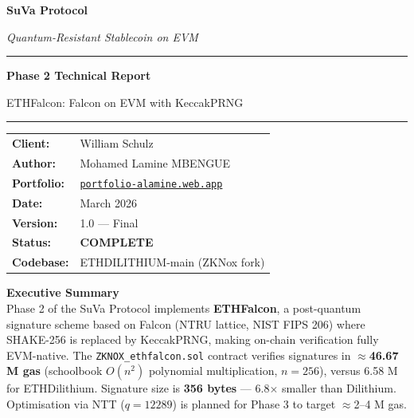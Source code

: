 \documentclass[11pt,a4paper]{article}
\begin{document}

\begin{titlepage}
\centering
\vspace*{2cm}
{\Huge\bfseries\textcolor{suva-blue}{SuVa Protocol}\par}
\vspace{0.5cm}
{\Large\textit{Quantum-Resistant Stablecoin on EVM}\par}
\vspace{1.5cm}
\rule{\linewidth}{0.5pt}
\vspace{0.5cm}
{\LARGE\bfseries Phase 2 Technical Report\par}
\vspace{0.3cm}
{\large ETHFalcon: Falcon on EVM with KeccakPRNG\par}
\vspace{0.5cm}
\rule{\linewidth}{0.5pt}
\vspace{2cm}

\begin{tabular}{ll}
\textbf{Client:}    & William Schulz \\[4pt]
\textbf{Author:}    & Mohamed Lamine MBENGUE \\[4pt]
\textbf{Portfolio:} & \href{https://portfolio-alamine.web.app}{\texttt{portfolio-alamine.web.app}} \\[4pt]
\textbf{Date:}      & March 2026 \\[4pt]
\textbf{Version:}   & 1.0 --- Final \\[4pt]
\textbf{Status:}    & \textcolor{pass-green}{\textbf{COMPLETE}} \\[4pt]
\textbf{Codebase:}  & ETHDILITHIUM-main (ZKNox fork) \\
\end{tabular}

\vfill
\begin{tcolorbox}[enhanced,colback=suva-blue!8,colframe=suva-blue,arc=4mm]
\textbf{Executive Summary} \\[4pt]
Phase 2 of the SuVa Protocol implements \textbf{ETHFalcon}, a post-quantum
signature scheme based on Falcon (NTRU lattice, NIST FIPS 206) where SHAKE-256
is replaced by KeccakPRNG, making on-chain verification fully EVM-native.
The \texttt{ZKNOX\_ethfalcon.sol} contract verifies signatures in
\textbf{$\approx$46.67 M gas} (schoolbook $O(n^2)$ polynomial multiplication,
$n=256$), versus 6.58 M for ETHDilithium. Signature size is
\textbf{356 bytes} --- 6.8$\times$ smaller than Dilithium.
Optimisation via NTT ($q=12289$) is planned for Phase 3 to target
$\approx$2--4 M gas.
\end{tcolorbox}
\end{titlepage}
\end{document}
